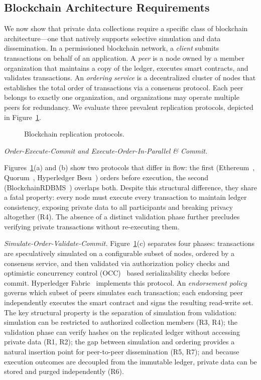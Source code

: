 \subsection{Blockchain Architecture Requirements}
\label{ss:arch-req}
We now show that private data collections require a specific class of blockchain architecture---one that natively supports selective simulation and data dissemination. In a permissioned blockchain network, a \textit{client} submits transactions on behalf of an application. A \textit{peer} is a node owned by a member organization that maintains a copy of the ledger, executes smart contracts, and validates transactions. An \textit{ordering service} is a decentralized cluster of nodes that establishes the total order of transactions via a consensus protocol. Each peer belongs to exactly one organization, and organizations may operate multiple peers for redundancy. We evaluate three prevalent replication protocols, depicted in Figure~\ref{fig:replication-protocol}.

\begin{figure}[t]
\centering
\small
\resizebox{\textwidth}{!}{}
  \vspace{-0.8cm}
\caption{Blockchain replication protocols.}
\label{fig:replication-protocol}
  \vspace{-0.2cm}
\end{figure}

\textit{Order-Execute-Commit and Execute-Order-In-Parallel \& Commit.}

Figures~\ref{fig:replication-protocol}(a) and (b) show two protocols that differ in flow: the first (Ethereum~\cite{ethereum}, Quorum~\cite{Quorum}, Hyperledger Besu~\cite{besu}) orders before execution, the second (BlockchainRDBMS~\cite{pgchain}) overlaps both. Despite this structural difference, they share a fatal property: every node must execute every transaction to maintain ledger consistency, exposing private data to all participants and breaking privacy altogether (R4). The absence of a distinct validation phase further precludes verifying private transactions without re-executing them.

\textit{Simulate-Order-Validate-Commit.}
Figure~\ref{fig:replication-protocol}(c) separates four phases: transactions are speculatively simulated on a configurable subset of nodes, ordered by a consensus service, and then validated via authorization policy checks and optimistic concurrency control (OCC)~\cite{occ} based serializability checks before commit. Hyperledger Fabric~\cite{hf} implements this protocol. An \textit{endorsement policy} governs which subset of peers simulates each transaction; each endorsing peer independently executes the smart contract and signs the resulting read-write set. The key structural property is the separation of simulation from validation: simulation can be restricted to authorized collection members (R3, R4); the validation phase can verify hashes on the replicated ledger without accessing private data (R1, R2); the gap between simulation and ordering provides a natural insertion point for peer-to-peer dissemination (R5, R7); and because execution outcomes are decoupled from the immutable ledger, private data can be stored and purged independently (R6).
